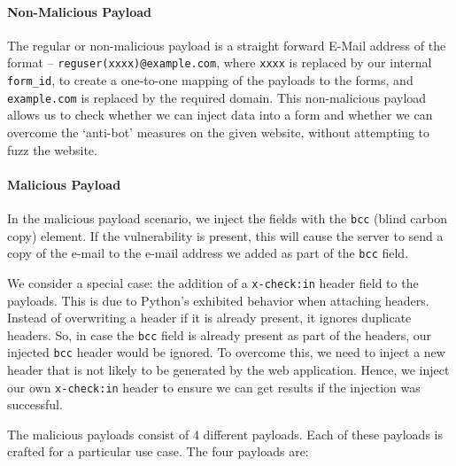 \paragraph{Non-Malicious Payload}
\label{Comp:Fuzzer:nmp}
The regular or non-malicious payload is a straight forward E-Mail address of the format -- \texttt{reguser(xxxx)@example.com}, where \texttt{xxxx} is replaced by our internal \texttt{form\_id}, to create a one-to-one mapping of the payloads to the forms, and \texttt{example.com} is replaced by the required domain.
This non-malicious payload allows us to check whether we can inject data into a form and whether we can overcome the `anti-bot' measures on the given website, without attempting to fuzz the website.

\paragraph{Malicious Payload}
\label{Comp:Fuzzer:mp}
In the malicious payload scenario, we inject the fields with the \texttt{bcc} (blind carbon copy) element. If the vulnerability is present, this will cause the server to send a copy of the e-mail to the e-mail address we added as part of the \texttt{bcc} field.

We consider a special case: the addition of a \texttt{x-check:in} header field to the payloads. This is due to Python's exhibited behavior when attaching
headers. Instead of overwriting a header if it is already present, it ignores duplicate headers. So, in case the \texttt{bcc} field is already present as part of the headers, our injected \texttt{bcc} header would be ignored. To overcome this, we need to inject a new header that is not likely to be generated by the web application. Hence, we inject our own \texttt{x-check:in} header to ensure we can get results if the injection was successful.

The malicious payloads consist of 4 different payloads. Each of these payloads is crafted for a particular use case. The four payloads are:

